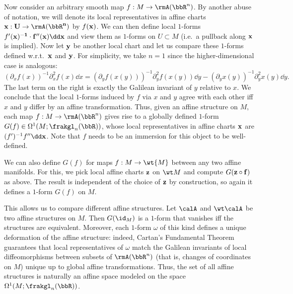 \begin{example}
    Now consider an arbitrary smooth map $f:M\to \rmA(\bbR^n)$. By another abuse of notation, we will denote its local representatives in affine charts $\bf{x}:U\to \rmA(\bbR^n)$ by $f(\bf{x})$. We can then define local $1$-forms $f'(\bf{x})^{-1}\cdot f''(\bf{x})\dd \bf{x}$ and view them as $1$-forms on $U\subset M$ (i.e.\ a pullback along $\bf{x}$ is implied).  Now let $\bf{y}$ be another local chart and let us compare these $1$-forms defined w.r.t.\ $\bf{x}$ and $\bf{y}$. For simplicity, we take $n=1$ since the higher-dimensional case is analogous:
    \[(\partial_x f(x))^{-1}\partial_x^2 f(x)\dd x=(\partial_y f(x(y)))^{-1}\partial_y^2 f(x(y))\dd y-(\partial_y x(y))^{-1}\partial_y^2 x(y)\dd y.\]
    The last term on the right is exactly the Galilean invariant of $y$ relative to $x$. We conclude that the local $1$-forms induced by $f$ via $x$ and $y$ agree with each other iff $x$ and $y$ differ by an affine transformation. Thus, given an affine structure on $M$, each map $f:M\to \rmA(\bbR^n)$ gives rise to a globally defined $1$-form $G(f)\in \Omega^1(M;\frakgl_n(\bbR))$, whose local representatives in affine charts $\bf{x}$ are $(f')^{-1}f''\dd \bf{x}$. Note that $f$ needs to be an immersion for this object to be well-defined.

    We can also define $G(f)$ for maps $f:M\to \wt{M}$ between any two affine manifolds. For this, we pick local affine charts $\bf{z}$ on $\wt M$ and compute $G(\bf{z}\circ f)$ as above. The result is independent of the choice of $\bf{z}$ by construction, so again it defines a $1$-form $G(f)$ on $M$.

    This allows us to compare different affine structures. Let $\calA$ and $\wt\calA$ be two affine structures on $M$. Then $G(\id_M)$ is a $1$-form that vanishes iff the structures are equivalent. Moreover, each $1$-form $\omega$ of this kind defines a unique deformation of the affine structure: indeed, Cartan's Fundamental Theorem guarantees that local representatives of $\omega$ match the Galilean invariants of local diffeomorphisms between subsets of $\rmA(\bbR^n)$ (that is, changes of coordinates on $M$) unique up to global affine transformations. Thus, the set of all affine structures is naturally an affine space modeled on the space $\Omega^1(M;\frakgl_n(\bbR))$.
    

\end{example}
